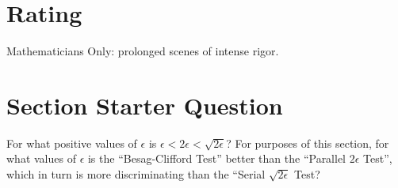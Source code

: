 \documentclass[12pt]{article}
\begin{document}
\myheader \mytitle

\hr


\hr

\usefirefox

\hr



\section*{Rating} %
Mathematicians Only:  prolonged scenes of intense rigor.

\hr

\section*{Section Starter Question} For what positive values of \(
\epsilon \) is \( \epsilon < 2 \epsilon < \sqrt{2 \epsilon} \)?  For
purposes of this section, for what values of \( \epsilon \) is the
``Besag-Clifford Test'' better than the ``Parallel \( 2 \epsilon \)
Test'', which in turn is more discriminating than the ``Serial \( \sqrt{2
\epsilon} \) Test?

\hr

\end{document}
